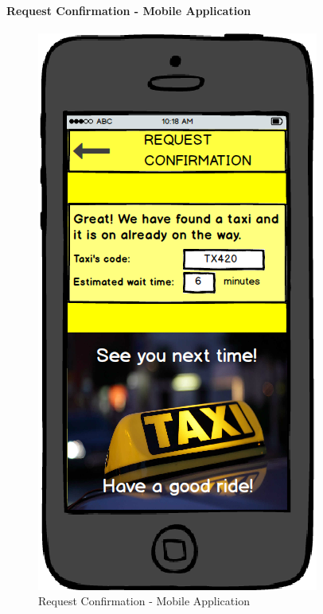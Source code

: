 		\paragraph{Request Confirmation - Mobile Application}
		\begin{figure}[!h]
			\begin{center}
				\includegraphics[scale=0.5]{../SE2_MOCKUPS/MobileAppRequestConfirmation.png}
				\caption{Request Confirmation - Mobile Application}
			\end{center}	
		\end{figure}
		\newpage
